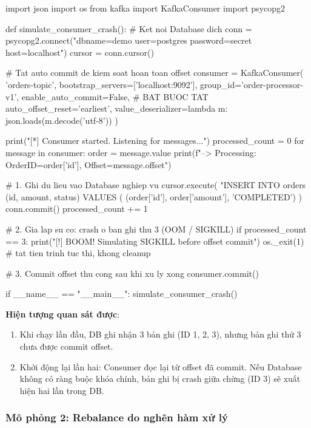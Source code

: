 \documentclass[12pt]{article}
\begin{document}
\begin{aivnpybox}
import json
import os
from kafka import KafkaConsumer
import psycopg2

def simulate_consumer_crash():
    # Ket noi Database dich
    conn = psycopg2.connect("dbname=demo user=postgres password=secret host=localhost")
    cursor = conn.cursor()

    # Tat auto commit de kiem soat hoan toan offset
    consumer = KafkaConsumer(
        'orders-topic',
        bootstrap_servers=['localhost:9092'],
        group_id='order-processor-v1',
        enable_auto_commit=False,   # BAT BUOC TAT
        auto_offset_reset='earliest',
        value_deserializer=lambda m: json.loads(m.decode('utf-8'))
    )

    print("[*] Consumer started. Listening for messages...")
    processed_count = 0
    for message in consumer:
        order = message.value
        print(f"--> Processing: OrderID={order['id']}, Offset={message.offset}")

        # 1. Ghi du lieu vao Database nghiep vu
        cursor.execute(
            "INSERT INTO orders (id, amount, status) VALUES (%
            (order['id'], order['amount'], 'COMPLETED')
        )
        conn.commit()
        processed_count += 1

        # 2. Gia lap su co: crash o ban ghi thu 3 (OOM / SIGKILL)
        if processed_count == 3:
            print("[!] BOOM! Simulating SIGKILL before offset commit")
            os._exit(1)   # tat tien trinh tuc thi, khong cleanup

        # 3. Commit offset thu cong sau khi xu ly xong
        consumer.commit()

if __name__ == "__main__":
    simulate_consumer_crash()
\end{aivnpybox}

\textbf{Hiện tượng quan sát được}:
\begin{enumerate}
    \item Khi chạy lần đầu, DB ghi nhận 3 bản ghi (ID 1, 2, 3), nhưng bản ghi thứ 3 chưa được commit offset.
    \item Khởi động lại lần hai: Consumer đọc lại từ offset đã commit. Nếu Database không có ràng buộc khóa chính, bản ghi bị crash giữa chừng (ID 3) sẽ xuất hiện hai lần trong DB.
\end{enumerate}

\subsubsection{Mô phỏng 2: Rebalance do nghẽn hàm xử lý}
\end{document}

